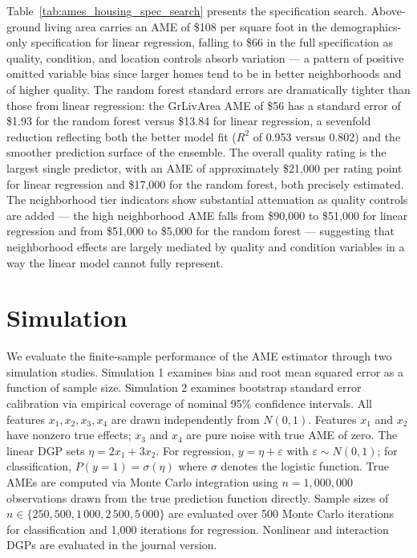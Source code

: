 \documentclass[conference]{IEEEtran}
\begin{document}
	Table~\ref{tab:ames_housing_spec_search} presents the specification search. Above-ground living area carries an AME of \$108 per square foot in the demographics-only specification for linear regression, falling to \$66 in the full specification as quality, condition, and location controls absorb variation --- a pattern of positive omitted variable bias since larger homes tend to be in better neighborhoods and of higher quality. The random forest standard errors are dramatically tighter than those from linear regression: the GrLivArea AME of \$56 has a standard error of \$1.93 for the random forest versus \$13.84 for linear regression, a sevenfold reduction reflecting both the better model fit ($R^2$ of 0.953 versus 0.802) and the smoother prediction surface of the ensemble. The overall quality rating is the largest single predictor, with an AME of approximately \$21,000 per rating point for linear regression and \$17,000 for the random forest, both precisely estimated. The neighborhood tier indicators show substantial attenuation as quality controls are added --- the high neighborhood AME falls from \$90,000 to \$51,000 for linear regression and from \$51,000 to \$5,000 for the random forest --- suggesting that neighborhood effects are largely mediated by quality and condition variables in a way the linear model cannot fully represent.
	
	\section{Simulation}
	
	We evaluate the finite-sample performance of the AME estimator through two simulation studies. Simulation 1 examines bias and root mean squared error as a function of sample size. Simulation 2 examines bootstrap standard error calibration via empirical coverage of nominal 95\% confidence intervals. All features $x_1, x_2, x_3, x_4$ are drawn independently from $N(0,1)$. Features $x_1$ and $x_2$ have nonzero true effects; $x_3$ and $x_4$ are pure noise with true AME of zero. The linear DGP sets $\eta = 2x_1 + 3x_2$. For regression, $y = \eta + \varepsilon$ with $\varepsilon \sim N(0,1)$; for classification, $P(y=1) = \sigma(\eta)$ where $\sigma$ denotes the logistic function. True AMEs are computed via Monte Carlo integration using $n = 1{,}000{,}000$ observations drawn from the true prediction function directly. Sample sizes of $n \in \{250, 500, 1{\,}000, 2{\,}500, 5{\,}000\}$ are evaluated over 500 Monte Carlo iterations for classification and 1{,}000 iterations for regression. Nonlinear and interaction DGPs are evaluated in the journal version.
	
\end{document}
